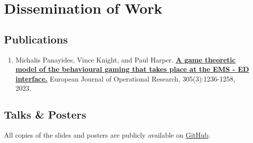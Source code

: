 \chapter*{Dissemination of Work}

\section*{Publications}
\begin{enumerate}
\def\labelenumi{\arabic{enumi}.}
\item
Michalis Panayides, Vince Knight, and Paul Harper.
\href{https://www.sciencedirect.com/science/article/pii/S0377221722005549?via%3Dihub}
{\textbf{A game theoretic model of the behavioural gaming that takes place at
the EMS - ED interface.}} European Journal of Operational Research,
305(3):1236-1258, 2023.
\end{enumerate}

\section*{Talks \& Posters}

All copies of the slides and posters are publicly available on
\href{https://github.com/MichalisPanayides/Talks}{GitHub}.

